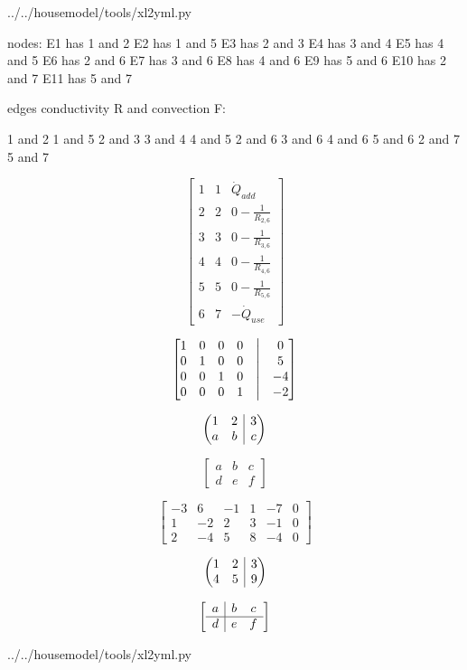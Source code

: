  
{../../housemodel/tools/xl2yml.py}
	
nodes:
E1 has 1 and 2
E2 has 1 and 5
E3 has 2 and 3
E4 has 3 and 4
E5 has 4 and 5
E6 has 2 and 6
E7 has 3 and 6
E8 has 4 and 6
E9 has 5 and 6
E10 has 2 and 7
E11 has 5 and 7

edges conductivity R and convection F:

1 and 2
1 and 5
2 and 3
3 and 4
4 and 5
2 and 6
3 and 6
4 and 6
5 and 6
2 and 7
5 and 7

\[
\begin{bmatrix}
	1 & 1 & \dot{Q}_{add}\\
	2 & 2 & 0 - \frac{1}{R_{2,6}}\\
	3 & 3 & 0 - \frac{1}{R_{3,6}}\\
	4 & 4 & 0 - \frac{1}{R_{4,6}}\\
	5 & 5 & 0 - \frac{1}{R_{5,6}}\\
	6 & 7 & -\dot{Q}_{use}
\end{bmatrix}
\]

$$
\begin{bmatrix}
	1 & 0 & 0 & 0 &\bigm| & 0 \\
	0 & 1 & 0 & 0 &\bigm| & 5 \\
	0 & 0 & 1 & 0 &\bigm| & -4 \\ 
	0 & 0 & 0 & 1 &\bigm| & -2
\end{bmatrix}
$$

\newenvironment{amatrix}[1]{%
	\left(\begin{array}{@{}*{#1}{c}|c@{}}
	}{%
	\end{array}\right)
}

\[
\begin{amatrix}{2}
	1 & 2 & 3 \\  a & b & c
\end{amatrix}
\]

\[
\left[
\begin{array}{cc|c}
	a & b & c \\
	d & e & f
\end{array}
\right]
\]

\[
\left[\begin{array}{rrrrr|r}
	-3 & 6 & -1 & 1 & -7 & 0\\
	1 & -2 & 2 & 3 & -1 & 0\\
	2 & -4 & 5 & 8 & -4 & 0
\end{array}\right]
\]

\[
\left(\hspace{-5pt}\begin{array}{cc|c}
	1 & 2 & 3 \\
	4 & 5 & 9
\end{array}\hspace{-5pt}\right)
\]

\[
    \left[\begin{array}{c|c c} 
	a & b & c\\ 
	\hline 
	d & e & f 
\end{array}\right] 
\]

 
{../../housemodel/tools/xl2yml.py}

\newpage
